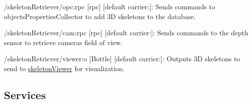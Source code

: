 \begin{DoxyItemize}
\item /skeleton\+Retriever/opc\+:rpc \mbox{[}rpc\mbox{]} \mbox{[}default carrier\+:\mbox{]}\+: Sends commands to objects\+Properties\+Collector to add 3D skeletons to the database.
\item /skeleton\+Retriever/cam\+:rpc \mbox{[}rpc\mbox{]} \mbox{[}default carrier\+:\mbox{]}\+: Sends commands to the depth sensor to retrieve camera\textquotesingle{}s field of view.
\item /skeleton\+Retriever/viewer\+:o \mbox{[}Bottle\mbox{]} \mbox{[}default carrier\+:\mbox{]}\+: Outputs 3D skeletons to send to \mbox{\hyperlink{group__skeletonViewer}{skeleton\+Viewer}} for visualization.
\end{DoxyItemize}\hypertarget{group__skeletonViewer_services_sec}{}\subsection{Services}\label{group__skeletonViewer_services_sec}
